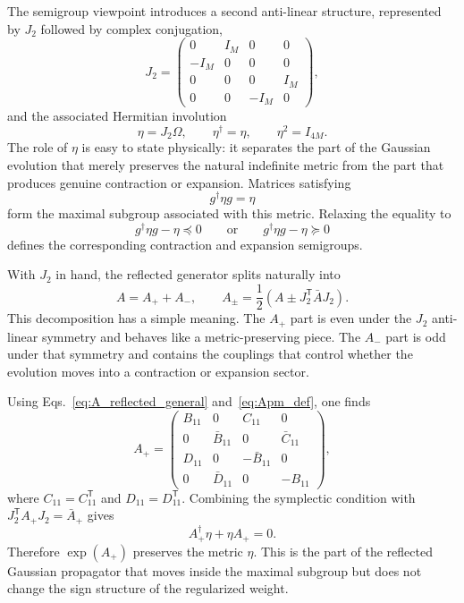 \documentclass[twocolumn,aps,prb,10pt,amsmath,amssymb,amsthm,superscriptaddress]{revtex4-2}
\newcommand{\trans}{\mathsf{T}}
\newcommand{\hc}{\dagger}
\theoremstyle{remark}
\begin{document}
The semigroup viewpoint introduces a second anti-linear structure, represented by $J_2$ followed by complex conjugation,
\begin{equation}
    J_2=
    \begin{pmatrix}
        0 & I_M & 0 & 0 \\
        -I_M & 0 & 0 & 0 \\
        0 & 0 & 0 & I_M \\
        0 & 0 & -I_M & 0
    \end{pmatrix},
\end{equation}
and the associated Hermitian involution
\begin{equation}
    \eta = J_2\Omega,
    \qquad
    \eta^\hc = \eta,
    \qquad
    \eta^2 = I_{4M}.
\end{equation}
The role of $\eta$ is easy to state physically: it separates the part of the Gaussian evolution that merely preserves the natural indefinite metric from the part that produces genuine contraction or expansion. Matrices satisfying
\begin{equation}
    g^\hc\eta g = \eta
\end{equation}
form the maximal subgroup associated with this metric. Relaxing the equality to
\begin{equation}
    g^\hc\eta g - \eta \preceq 0
    \qquad\text{or}\qquad
    g^\hc\eta g - \eta \succeq 0
\end{equation}
defines the corresponding contraction and expansion semigroups.

With $J_2$ in hand, the reflected generator splits naturally into
\begin{equation}
    A = A_{+} + A_{-},
    \qquad
    A_{\pm} = \frac12\left(A \pm J_2^\trans \bar A J_2\right).
    \label{eq:Apm_def}
\end{equation}
This decomposition has a simple meaning. The $A_{+}$ part is even under the $J_2$ anti-linear symmetry and behaves like a metric-preserving piece. The $A_{-}$ part is odd under that symmetry and contains the couplings that control whether the evolution moves into a contraction or expansion sector.

Using Eqs.~\eqref{eq:A_reflected_general} and~\eqref{eq:Apm_def}, one finds
\begin{equation}
    A_{+}=
    \begin{pmatrix}
        B_{11} & 0 & C_{11} & 0 \\
        0 & \bar B_{11} & 0 & \bar C_{11} \\
        D_{11} & 0 & -\bar B_{11} & 0 \\
        0 & \bar D_{11} & 0 & -B_{11}
    \end{pmatrix},
    \label{eq:Aplus_form}
\end{equation}
where $C_{11}=C_{11}^\trans$ and $D_{11}=D_{11}^\trans$. Combining the symplectic condition with $J_2^\trans A_{+}J_2=\bar A_{+}$ gives
\begin{equation}
    A_{+}^\hc\eta + \eta A_{+} = 0.
\end{equation}
Therefore $\exp(A_{+})$ preserves the metric $\eta$. This is the part of the reflected Gaussian propagator that moves inside the maximal subgroup but does not change the sign structure of the regularized weight.
\end{document}
